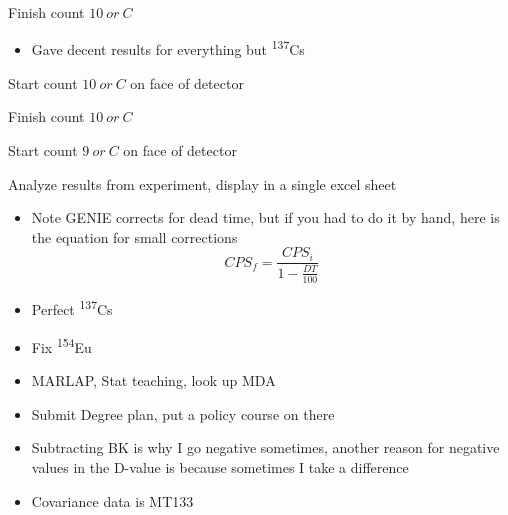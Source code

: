\documentclass[idxtotoc,hyperref,openany,oneside]{labbook} %
\newcommand{\cmark}{\ding{51}}%
\newcommand{\done}{\rlap{$\square$}{\raisebox{2pt}{\large\hspace{1pt}\cmark}}%
  \hspace{-2.5pt}}
\newcommand{\tss}{\textsuperscript}
\begin{document}
\begin{todolist}
\item[\done]{Finish count $\boxed{10\ or\ C}$}
  \begin{itemize}
  \item{Gave decent results for everything but \tss{137}Cs}
  \end{itemize}
\item[\done]{Start count $\boxed{10\ or\ C}$ on face of detector}
\item[\done]{Finish count $\boxed{10\ or\ C}$}
\item[\done]{Start count $\boxed{9\ or\ C}$ on face of detector}
\item[\done]{Analyze results from experiment, display in
  a single excel sheet}
  \begin{itemize}
  \item{Note GENIE corrects for dead time, but if you
    had to do it by hand, here is the equation for small
    corrections}
    \begin{equation*}
      CPS_f=\frac{CPS_i}{1-\frac{DT}{100}}
    \end{equation*}
  \end{itemize}
\end{todolist}

\begin{itemize}
\item{Perfect \tss{137}Cs}
\item{Fix \tss{154}Eu}
\item{MARLAP, Stat teaching, look up MDA}
\item{Submit Degree plan, put a policy course on there}
\item{Subtracting BK is why I go negative sometimes,
  another reason for negative values in the D-value is
  because sometimes I take a difference}
\item{Covariance data is MT133}
\end{itemize}


\end{document}
